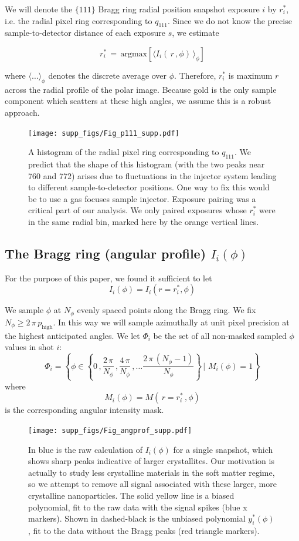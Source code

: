 \documentclass [12pt,fleqn]{article}
\def \be {\begin{equation}}
\def \ee {\end{equation}}
\begin{document}
We will denote the $\{111\}$ Bragg ring radial position snapshot exposure $i$ by $r^*_i$, i.e. the radial pixel ring corresponding to $q_{111}$. Since we do not know the precise sample-to-detector distance of each exposure $s$, we estimate 

\be
r^*_i   \,=\, \text{argmax} \left[ \big \langle I_i \left(\,r\,, \phi\right)\, \big \rangle_{\phi} \right]
\ee

where $\langle \dots \rangle _{\phi}$ denotes the discrete average over $\phi$. Therefore, $r^*_i$ is maximum $r$ across the radial profile of the polar image. Because gold is the only sample component which scatters at these high angles, we assume this is a robust approach.

\begin{figure}[H]
\caption{A histogram of the radial pixel ring corresponding to  $q_{111}$. We predict that the shape of this histogram (with the two peaks near 760 and 772) arises due to fluctuations in the injector system leading to different sample-to-detector positions. One way to fix this would be to use a gas focuses sample injector. Exposure pairing was a critical part of our analysis. We only paired exposures whose $r^*_i$ were in the same radial bin, marked here by the orange vertical lines.}
\texttt{[image: supp\_figs/Fig\_p111\_supp.pdf]}
\label{supp:p111}
\end{figure}

\subsection{The Bragg ring (angular profile) $I_i(\phi)$}
For  the purpose of this paper, we found it sufficient to let 
\be
I_i(\phi) = I_i(r=r^*_i, \phi)
\ee

We sample $\phi$ at $N_{\phi}$ evenly spaced points along the Bragg ring. We fix $N_\phi \ge 2\,\pi\,p_{\text{high}}$. In this way we will sample azimuthally at unit pixel precision at the highest anticipated angles. We let $\varPhi_i$ be the set of all non-masked sampled $\phi$ values in shot $i$:
\be \label{setphi}
\varPhi_i = \left \{ \phi \in   \left \{0\,, \frac{2\,\pi}{N_\phi}\,, \frac{4\,\pi}{N_\phi}\,, \dots \frac{2\,\pi\,(N_\phi-1)}{N_\phi} \right \}\, \big | \,\,M_i(\phi) = 1\right  \}
\ee
where
\be
M_i(\phi) = M \left( \,r=r^*_i \, , \phi \right ) 
\ee
is the corresponding angular intensity mask.
\begin{figure}[H]
\texttt{[image: supp\_figs/Fig\_angprof\_supp.pdf]}
\caption{In blue is the raw calculation of $I_i(\phi)$ for a single snapshot, which shows sharp peaks indicative of larger crystallites. Our motivation is actually to study less crystalline materials in the soft matter regime, so we attempt to remove all signal associated with these larger, more crystalline nanoparticles. The solid yellow line is a biased polynomial, fit to the raw data with the signal spikes (blue x markers). Shown in dashed-black is the unbiased polynomial $y^*_i(\phi)$, fit to the data without the Bragg peaks (red triangle markers).}
\label{supp:prof}
\end{figure}
\end{document}

